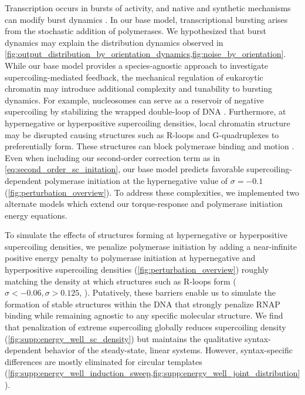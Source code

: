 \documentclass[11pt]{article}
\begin{document}
Transcription occurs in bursts of activity, and native and synthetic mechanisms can modify burst dynamics \parencite{desaiDNArepairPathwayCan2021,chongMechanismTranscriptionalBursting2014,poppAlteringTranscriptionFactor2021}.
In our base model, transcriptional bursting arises from the stochastic addition of polymerases. We hypothesized that burst dynamics may explain the distribution dynamics observed in \cref{fig:output_distribution_by_orientation_dynamics,fig:noise_by_orientation}. While our base model provides a species-agnostic approach to investigate supercoiling-mediated feedback, the mechanical regulation of eukaroytic chromatin may introduce additional complexity and tunability to bursting dynamics. For example, nucleosomes can serve as a reservoir of negative supercoiling by stabilizing the wrapped double-loop of DNA \parencite{leSynergisticCoordinationChromatin2019}.
Furthermore, at hypernegative or hyperpositive supercoiling densities, local chromatin structure may be disrupted causing structures such as R-loops and G-quadruplexes to preferentially form. These structures can block polymerase binding and motion \parencite{stolzInterplayDNASequence2019}.
Even when including our second-order correction term as in \cref{eq:second_order_sc_initation}, our base model predicts favorable supercoiling-dependent polymerase initiation at the hypernegative value of \(\sigma = -0.1\) (\cref{fig:perturbation_overview}). To address these complexities, we implemented two alternate models which extend our torque-response and polymerase initiation energy equations. 

To simulate the effects of structures forming at hypernegative or hyperpositive supercoiling densities, we penalize polymerase initiation by adding a near-infinite positive energy penalty to polymerase initiation at hypernegative and hyperpositive supercoiling densities (\cref{fig:perturbation_overview}) roughly matching the density at which structures such as R-loops form (\(\sigma < -0.06, \sigma > 0.125\), \parencite{stolzInterplayDNASequence2019}). Putatively, these barriers enable us to simulate the formation of stable structures within the DNA that strongly penalize RNAP binding while remaining agnostic to any specific molecular structure. We find that penalization of extreme supercoiling globally reduces supercoiling density (\cref{fig:supp:energy_well_sc_density}) but maintains the qualitative syntax-dependent behavior of the steady-state, linear systems. However, syntax-specific differences are mostly eliminated for circular templates (\cref{fig:supp:energy_well_induction_sweep,fig:supp:energy_well_joint_distribution}).
\end{document}
